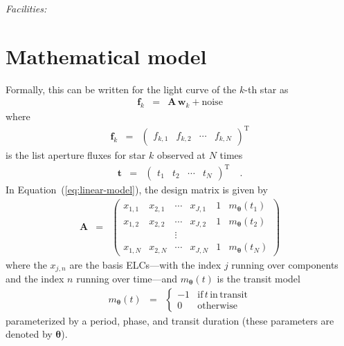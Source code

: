 \documentclass[12pt,preprint]{aastex}
\newcommand{\Eq}[1]{Equation~(\ref{eq:#1})}
\newcommand{\eq}[1]{\Eq{#1}}
\newcommand{\eqlabel}[1]{\label{eq:#1}}
\newcommand{\sectlabel}[1]{\label{sect:#1}}
\newcommand{\T}{\ensuremath{\mathrm{T}}}
\newcommand{\bvec}[1]{{\ensuremath{\boldsymbol{#1}}}}
\begin{document}
{\it Facilities:} 

\appendix

\section{Mathematical model}\sectlabel{math}

Formally, this can be written for the light curve of the $k$-th star as
\begin{eqnarray}\eqlabel{linear-model}
\bvec{f}_k &=& \bvec{A}\,\bvec{w}_k + \mathrm{noise}
\end{eqnarray}
where
\begin{eqnarray}
\bvec{f}_k &=& \left (\begin{array}{cccc}
    f_{k,1} & f_{k,2} & \cdots & f_{k,N}
\end{array}\right )^\T
\end{eqnarray}
is the list aperture fluxes for star $k$ observed at $N$ times
\begin{eqnarray}
\bvec{t} &=& \left (\begin{array}{cccc}
    t_{1} & t_{2} & \cdots & t_{N}
\end{array}\right )^\T \quad.
\end{eqnarray}
In \eq{linear-model}, the design matrix is given by
\begin{eqnarray}
\bvec{A} &=& \left (\begin{array}{cccccc}
    x_{1,1} & x_{2,1} & \cdots & x_{J,1} & 1 & m_\bvec{\theta}(t_1) \\
    x_{1,2} & x_{2,2} & \cdots & x_{J,2} & 1 & m_\bvec{\theta}(t_2) \\
    && \vdots &&&\\
    x_{1,N} & x_{2,N} & \cdots & x_{J,N} & 1 & m_\bvec{\theta}(t_N)
\end{array}\right )
\end{eqnarray}
where the $x_{j,n}$ are the basis ELCs---with the index $j$ running over
components and the index $n$ running over time---and $m_\bvec{\theta}(t)$ is
the transit model
\begin{eqnarray}
m_\bvec{\theta}(t) &=& \left\{\begin{array}{cl}
-1 & \mathrm{if\,}t\,\mathrm{in\,transit} \\
0 & \mathrm{otherwise}
\end{array}\right.
\end{eqnarray}
parameterized by a period, phase, and transit duration (these parameters are
denoted by \bvec{\theta}).
\end{document}
